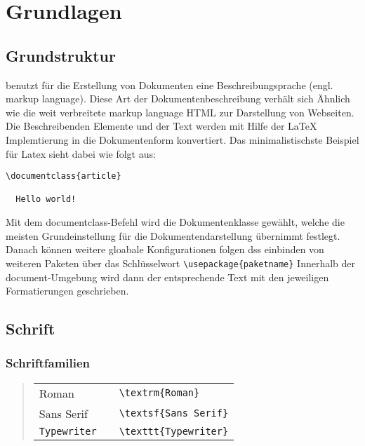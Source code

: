 \chapter{\latex Grundlagen}
\label{cha:ArbeitenMitLatex}


\section{Grundstruktur}

\latex benutzt  für die Erstellung von Dokumenten eine Beschreibungsprache (engl. markup language). 
Diese Art der Dokumentenbeschreibung verhält sich Ähnlich wie die weit verbreitete markup language HTML zur Darstellung von Webseiten.
Die Beschreibenden Elemente und der Text werden mit Hilfe der LaTeX Implemtierung in die Dokumentenform konvertiert.
Das minimalistischste Beispiel für Latex sieht dabei wie folgt aus: \\

\begin{lstlisting}
\documentclass{article}

  Hello world!

\end{lstlisting}

Mit dem documentclass-Befehl wird die Dokumentenklasse gewählt, welche die meisten Grundeinstellung für die Dokumentendarstellung übernimmt \bzw festlegt.
Danach können weitere gloabale Konfigurationen folgen \zB dss einbinden von weiteren Paketen über das Schlüsselwort \verb!\usepackage{paketname}!
Innerhalb der document-Umgebung wird dann der entsprechende Text mit den jeweiligen Formatierungen geschrieben.




\section{Schrift}

\subsection{Schriftfamilien}
%
\begin{quote}
\begin{tabular}{lcl}
\textrm{Roman}      & & \verb!\textrm{Roman}!\\
\textsf{Sans Serif} & & \verb!\textsf{Sans Serif}!\\
\texttt{Typewriter} & & \verb!\texttt{Typewriter}!\\
\end{tabular}
\end{quote}
%

